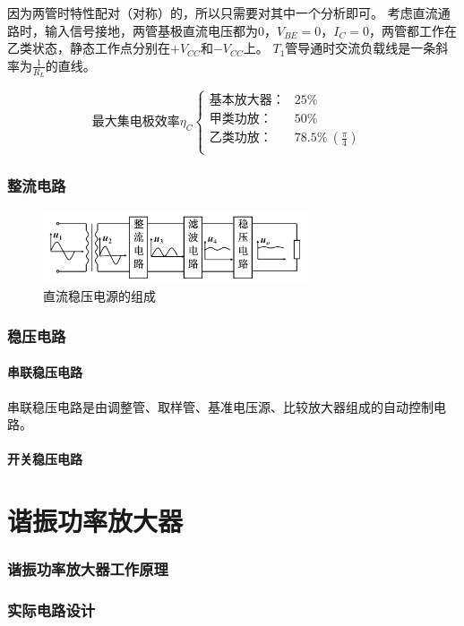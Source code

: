 \documentclass[10pt]{article}
\begin{document}
\par
因为两管时特性配对（对称）的，所以只需要对其中一个分析即可。
考虑直流通路时，输入信号接地，两管基极直流电压都为$0$，$V_{BE} = 0$，$I_C = 0$，两管都工作在
乙类状态，静态工作点分别在$+V_{CC}$和$-V_{CC}$上。
$T_{1}$管导通时交流负载线是一条斜率为$\frac{1}{R_L}$的直线。


\[
\text{最大集电极效率} \eta_C
\left\{
\begin{array}{lll}
\text{基本放大器：} & 25\% & \\
\text{甲类功放：} & 50\% & \\
\text{乙类功放：} & 78.5\% \ (\frac{\pi}{4}) & \\
\end{array}
\right.
\]
\section{整流电路}
\begin{figure}[H]
    \centering
    \includegraphics[width=0.7\textwidth]{pictures/bw-2-6.png}
    \caption{直流稳压电源的组成}
\end{figure}


\section{稳压电路}
\subsection{串联稳压电路}
串联稳压电路是由调整管、取样管、基准电压源、比较放大器组成的自动控制电路。
\subsection{开关稳压电路}

\newpage
\part{谐振功率放大器}
\section{谐振功率放大器工作原理}
\section{实际电路设计}
\end{document}
